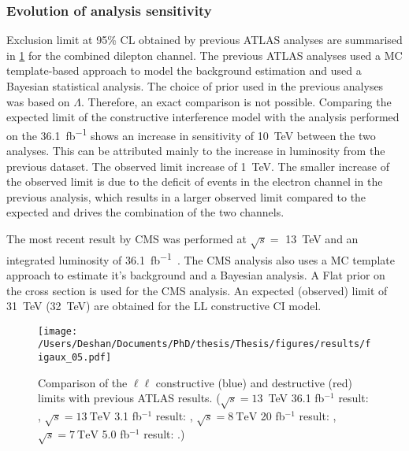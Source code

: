 \subsubsection{Evolution of analysis sensitivity}
Exclusion limit at 95\% CL obtained by previous ATLAS analyses are summarised in \cref{fig:limit_evol} for the combined dilepton channel. The previous ATLAS analyses used a MC template-based approach to model the background estimation and used a Bayesian statistical analysis. The choice of prior used in the previous analyses was based on $\Lambda$. Therefore, an exact comparison is not possible. Comparing the expected limit of the constructive interference model with the analysis performed on the \SI{36.1}{\femto\barn^{-1}} shows an increase in sensitivity of \SI{10}{\tera\electronvolt} between the two analyses. This can be attributed mainly to the increase in luminosity from the previous dataset. The observed limit increase of \SI{1}{\tera\electronvolt}. The smaller increase of the observed limit is due to the deficit of events in the electron channel in the previous analysis, which results in a larger observed limit compared to the expected and drives the combination of the two channels. 

The most recent result by CMS was performed at $\sqrt{s} = $ \SI{13}{\tera\electronvolt} and an integrated luminosity of \SI{36.1}{\femto\barn^{-1}}~\cite{Sirunyan:2018ipj}. The CMS analysis also uses a MC template approach to estimate it's background and a Bayesian analysis. A Flat prior on the cross section is used for the CMS analysis. An expected (observed) limit of \SI{31}{\tera\electronvolt} (\SI{32}{\tera\electronvolt}) are obtained for the LL constructive CI model. 

\begin{figure}[!htpb]
    \centering
    \texttt{[image: /Users/Deshan/Documents/PhD/thesis/Thesis/figures/results/figaux\_05.pdf]}
    \caption[Comparison of the $\ell\ell$ constructive (blue) and destructive (red) limits with previous ATLAS results.]{Comparison of the $\ell\ell$ constructive (blue) and destructive (red) limits with previous ATLAS results. ($\sqrt{s}=13$~TeV 36.1 fb$^{-1}$ result: \cite{EXOT-2016-05}, $\sqrt{s}=\SI{13}{\tera\electronvolt}$ 3.1 fb$^{-1}$ result: \cite{EXOT-2015-07}, $\sqrt{s}=\SI{8}{\tera\electronvolt}$ 20 fb$^{-1}$ result: \cite{EXOT-2013-19}, $\sqrt{s}=\SI{7}{\tera\electronvolt}$ 5.0 fb$^{-1}$ result: \cite{EXOT-2012-17}.)}
    \label{fig:limit_evol}
\end{figure}